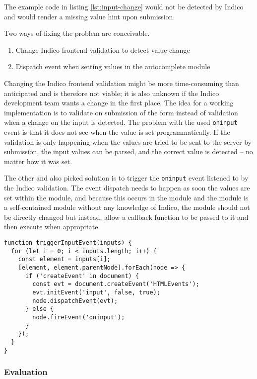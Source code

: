 The example code in listing \ref{lst:input-change} would not be detected by Indico and would render a missing value hint upon submission.

Two ways of fixing the problem are conceivable.

\begin{enumerate}
    \item Change Indico frontend validation to detect value change
    \item Dispatch event when setting values in the autocomplete module
\end{enumerate}

Changing the Indico frontend validation might be more time-consuming than anticipated and is therefore not viable; it is also unknown if the Indico development team wants a change in the first place. The idea for a working implementation is to validate on submission of the form instead of validation when a change on the input is detected. The problem with the used \texttt{oninput} event is that it does not see when the value is set programmatically. If the validation is only happening when the values are tried to be sent to the server by submission, the input values can be parsed, and the correct value is detected -- no matter how it was set. 

The other and also picked solution is to trigger the \texttt{oninput} event listened to by the Indico validation. The event dispatch needs to happen as soon the values are set within the module, and because this occurs in the module and the module is a self-contained module without any knowledge of Indico, the module should not be directly changed but instead, allow a callback function to be passed to it and then execute when appropriate.

\begin{lstlisting}[language=Other,columns=fullflexible, caption={Dispatching the \texttt{oninput} event within a callback.}, label={lst:oninput-callback}]
function triggerInputEvent(inputs) {
  for (let i = 0; i < inputs.length; i++) {
    const element = inputs[i];
    [element, element.parentNode].forEach(node => {
      if ('createEvent' in document) {
        const evt = document.createEvent('HTMLEvents');
        evt.initEvent('input', false, true);
        node.dispatchEvent(evt);
      } else {
        node.fireEvent('oninput');
      }
    });
  }
}
\end{lstlisting}

\subsubsection{Evaluation}\mbox{}\\

